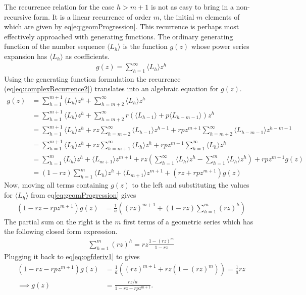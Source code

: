 The recurrence relation for the case $h > m+1$ is not as easy to bring in a non-recursive form. It is a linear recurrence of order $m$, the initial $m$ elements of which are given by eq\ref{eq:geomProgression}.
This recurrence is perhaps most effectively approached with generating functions. The ordinary generating function of the number sequence $\langle L_h \rangle$ is the function $g(z)$ whose power series expansion has $\langle L_h \rangle$ as coefficients.
\begin{align}
    g(z) = \sum_{h=1}^{\infty} \langle L_h \rangle z^h
\end{align}
Using the generating function formulation the recurrence (eq\ref{eq:complexRecurrence2}) translates into an algebraic equation for $g(z)$.
\begin{align}
    g(z) &= \sum_{h=1}^{m+1} \langle L_h \rangle z^h + \sum_{h=m+2}^{\infty} \langle L_h \rangle z^h\nonumber\\
         &= \sum_{h=1}^{m+1} \langle L_h \rangle z^h + \sum_{h=m+2}^{\infty} r\left(\langle L_{h-1}\rangle + p\langle L_{h-m-1}\rangle\right)z^h\nonumber\\
         &= \sum_{h=1}^{m+1} \langle L_h \rangle z^h + rz\sum_{h=m+2}^{\infty}\langle L_{h-1}\rangle z^{h-1} + rpz^{m+1}\sum_{h=m+2}^{\infty}\langle L_{h-m-1}\rangle z^{h-m-1}\nonumber\\
         &= \sum_{h=1}^{m+1} \langle L_h \rangle z^h + rz\sum_{h=m+1}^{\infty}\langle L_h\rangle z^{h} + rpz^{m+1}\sum_{h=1}^{\infty}\langle L_{h} \rangle z^{h}\nonumber\\
         &= \sum_{h=1}^{m} \langle L_h \rangle z^h + \langle L_{m+1} \rangle z^{m+1} + rz\left(\sum_{h=1}^{\infty}\langle L_{h} \rangle z^{h} - \sum_{h=1}^{m}\langle L_{h}\rangle z^{h} \right) + rpz^{m+1}g(z)\nonumber\\
         &= (1 - rz)\sum_{h=1}^{m} \langle L_h \rangle z^h + \langle L_{m+1}\rangle z^{m+1} + \left(rz + rpz^{m+1}\right)g(z)
\end{align}
Now, moving all terms containing $g(z)$ to the left and substituting the values for $\langle L_h \rangle$ from eq\ref{eq:geomProgression} gives
\begin{align}
    (1 - rz - rpz^{m+1})g(z) &= \frac{1}{a}\left({(rz)}^{m+1} + (1 - rz)\sum_{h=1}^{m} {(rz)}^h\right)\label{eq:ogfderiv1}
\end{align}
The partial sum on the right is the $m$ first terms of a geometric series which has the following closed form expression.
\begin{align*}
    \sum_{h=1}^{m} {(rz)}^h = rz\frac{1 - {(rz)}^m}{1-rz}
\end{align*}
Plugging it back to eq\ref{eq:ogfderiv1} to gives
\begin{align}
    (1 - rz - rpz^{m+1})g(z)
		&= \frac{1}{a}\left({(rz)}^{m+1} + rz\left(1 - {(rz)}^m\right)\right)\nonumber
        = \frac{1}{a}rz\nonumber\\
    \implies g(z) &= \frac{rz/a}{1 - rz - rpz^{m+1}}\label{eq:ogf}.
\end{align}

